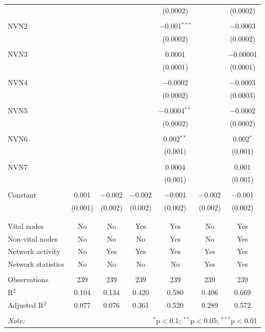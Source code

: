 \begin{table}[!htbp]
\begin{tabular}{@{\extracolsep{5pt}}lcccccc}
  &  &  &  & (0.0002) &  & (0.0002) \\ 
  & & & & & & \\ 
 NVN2 &  &  &  & $-$0.001$^{***}$ &  & $-$0.0003 \\ 
  &  &  &  & (0.0002) &  & (0.0002) \\ 
  & & & & & & \\ 
 NVN3 &  &  &  & 0.0001 &  & $-$0.00001 \\ 
  &  &  &  & (0.0001) &  & (0.0001) \\ 
  & & & & & & \\ 
 NVN4 &  &  &  & $-$0.0002 &  & $-$0.0003 \\ 
  &  &  &  & (0.0002) &  & (0.0003) \\ 
  & & & & & & \\ 
 NVN5 &  &  &  & $-$0.0004$^{**}$ &  & $-$0.0002 \\ 
  &  &  &  & (0.0002) &  & (0.0002) \\ 
  & & & & & & \\ 
 NVN6 &  &  &  & 0.002$^{**}$ &  & 0.002$^{*}$ \\ 
  &  &  &  & (0.001) &  & (0.001) \\ 
  & & & & & & \\ 
 NVN7 &  &  &  & 0.0004 &  & 0.001 \\ 
  &  &  &  & (0.001) &  & (0.001) \\ 
  & & & & & & \\ 
 Constant & 0.001 & $-$0.002 & $-$0.002 & $-$0.001 & $-$0.002 & $-$0.001 \\ 
  & (0.001) & (0.002) & (0.002) & (0.002) & (0.002) & (0.002) \\ 
  & & & & & & \\ 
\hline \\[-1.8ex] 
Vital nodes & No & No & Yes & Yes & No & Yes \\ 
Non-vital nodes & No & No & No & Yes & No & Yes \\ 
Network activity & No & Yes & Yes & Yes & Yes & Yes \\ 
Network statistics & No & No & No & No & Yes & Yes \\ 
\hline &  &  &  &  &  &  \\ 
Observations & 239 & 239 & 239 & 239 & 239 & 239 \\ 
R$^{2}$ & 0.104 & 0.134 & 0.420 & 0.580 & 0.406 & 0.669 \\ 
Adjusted R$^{2}$ & 0.077 & 0.076 & 0.361 & 0.520 & 0.289 & 0.572 \\ 
\hline 
\hline \\[-1.8ex] 
\textit{Note:}  & \multicolumn{6}{r}{$^{*}$p$<$0.1; $^{**}$p$<$0.05; $^{***}$p$<$0.01} \\ 
\end{tabular} 
\end{table} 
